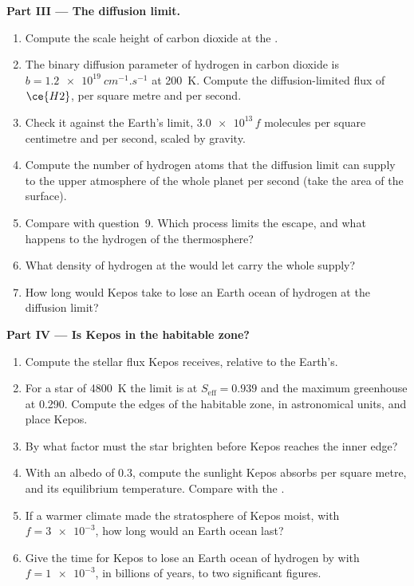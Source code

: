 \begin{problem}
\medskip\noindent\textbf{Part III --- The diffusion limit.}
\begin{enumerate}[resume]
\item Compute the scale height of carbon dioxide at the .
\item The binary diffusion parameter of hydrogen in carbon dioxide is
  $b = \qty{1.2e19}{cm^{-1}.s^{-1}}$ at \qty{200}{K}. Compute the
  diffusion-limited flux of $\ce{H2}$, per square metre and per second.
\item Check it against the Earth's limit, $\num{3.0e13}\,f$ molecules per
  square centimetre and per second, scaled by gravity.
\item Compute the number of hydrogen atoms that the diffusion limit can
  supply to the upper atmosphere of the whole planet per second (take the
  area of the surface).
\item Compare with question~9. Which process limits the escape, and what
  happens to the hydrogen of the thermosphere?
\item What density of hydrogen at the  would let  carry
  the whole supply?
\item How long would Kepos take to lose an Earth ocean of hydrogen at the
  diffusion limit?
\end{enumerate}

\medskip\noindent\textbf{Part IV --- Is Kepos in the habitable zone?}
\begin{enumerate}[resume]
\item Compute the stellar flux Kepos receives, relative to the Earth's.
\item For a star of \qty{4800}{K} the  limit is at
  $S_\mathrm{eff} = 0.939$ and the maximum greenhouse at 0.290. Compute the
  edges of the habitable zone, in astronomical units, and place Kepos.
\item By what factor must the star brighten before Kepos reaches the inner
  edge?
\item With an albedo of 0.3, compute the sunlight Kepos absorbs per square
  metre, and its equilibrium temperature. Compare with the .
\item If a warmer climate made the stratosphere of Kepos moist, with
  $f = \num{3e-3}$, how long would an Earth ocean last?
\item Give the time for Kepos to lose an Earth ocean of hydrogen by
   with $f = \num{1e-3}$, in billions of years, to
  two significant figures.
\end{enumerate}
\end{problem}
